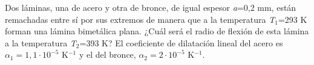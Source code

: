 
Dos láminas, una de acero y otra de bronce, de igual espesor \textit{a}=0,2 mm, están remachadas entre sí por sus extremos de manera que a la temperatura \textit{T}$_1$=293 K forman una lámina bimetálica plana. ¿Cuál será el radio de flexión de esta lámina a la temperatura \textit{T}$_2$=393 K? El coeficiente de dilatación lineal del acero es $\alpha_1 = 1,1 \cdot 10^{-5}$ K$^{-1}$ y el del bronce, $\alpha_2 = 2 \cdot 10^{-5}$ K$^{-1}$.